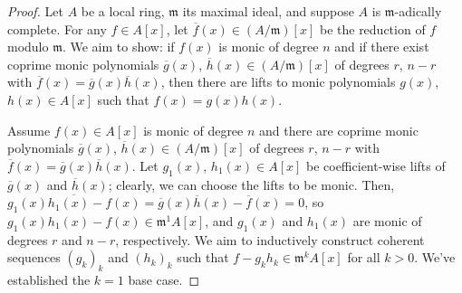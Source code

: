 \begin{proof}
Let $A$ be a local ring, $\mathfrak{m}$ its maximal ideal, and suppose $A$ is $\mathfrak{m}$-adically complete.
For any $f \in A[x]$, let $\overline{f}(x) \in (A/\mathfrak{m})[x]$ be the reduction of $f$ modulo $\mathfrak{m}$.
We aim to show: if $f(x)$ is monic of degree $n$ and if there exist coprime monic polynomials $\overline{g}(x)$,
$\overline{h}(x) \in (A/\mathfrak{m})[x]$ of degrees $r$, $n-r$ with $\overline{f}(x) = \overline{g}(x)\overline{h}(x)$,
then there are lifts to monic polynomials $g(x)$, $h(x) \in A[x]$ such that $f(x) = g(x)h(x)$.

Assume $f(x) \in A[x]$ is monic of degree $n$ and there are coprime monic polynomials $\overline{g}(x)$, 
$\overline{h}(x) \in (A/\mathfrak{m})[x]$ of degrees $r$, $n-r$ with $\overline{f}(x) = \overline{g}(x)\overline{h}(x)$.
Let $g_1(x)$, $h_1(x) \in A[x]$ be coefficient-wise lifts of $\overline{g}(x)$ and $\overline{h}(x)$; clearly, we can choose the lifts 
to be monic. Then, $\overline{g_1(x)h_1(x) - f(x)} = \overline{g}(x)\overline{h}(x) - \overline{f}(x) = 0$, so $g_1(x)h_1(x) - f(x) \in \mathfrak{m}^1 A[x]$,
and $g_1(x)$ and $h_1(x)$ are monic of degrees $r$ and $n-r$, respectively. We aim to inductively construct coherent sequences
$(g_k)_k$ and $(h_k)_k$ such that $f - g_k h_k \in \mathfrak{m}^k A[x]$ for all $k > 0$. We've established the $k = 1$ base case.


\end{proof}
